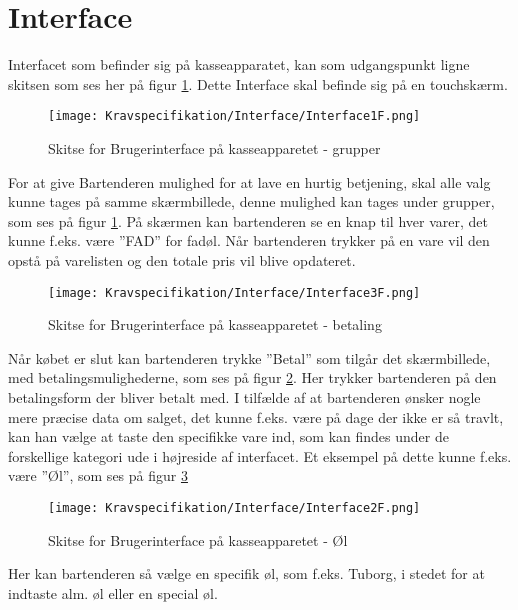 \section{Interface}
Interfacet som befinder sig på kasseapparatet, kan som udgangspunkt ligne skitsen som ses her på figur \ref{fig:Interface1}. Dette Interface skal befinde sig på en touchskærm.

\begin{figure}[ht]
	\centering
	\texttt{[image: Kravspecifikation/Interface/Interface1F.png]}
	\caption{Skitse for Brugerinterface på kasseapparetet - grupper}
	\label{fig:Interface1}
\end{figure}

For at give Bartenderen mulighed for at lave en hurtig betjening, skal alle valg kunne tages på samme skærmbillede, denne mulighed kan tages under grupper, som ses på figur \ref{fig:Interface1}. 
\newline\newline
På skærmen kan bartenderen se en knap til hver varer, det kunne f.eks. være ''FAD'' for fadøl. Når bartenderen trykker på en vare vil den opstå på varelisten og den totale pris vil blive opdateret. 

\begin{figure}[H]
	\centering
	\texttt{[image: Kravspecifikation/Interface/Interface3F.png]}
	\caption{Skitse for Brugerinterface på kasseapparetet - betaling}
	\label{fig:Interface3}
\end{figure}
Når købet er slut kan bartenderen trykke ''Betal'' som tilgår det skærmbillede, med betalingsmulighederne, som ses på figur \ref{fig:Interface3}. Her trykker bartenderen på den betalingsform der bliver betalt med. 
\newpage
I tilfælde af at bartenderen ønsker nogle mere præcise data om salget, det kunne f.eks. være på dage der ikke er så travlt, kan han vælge at taste den specifikke vare ind, som kan findes under de forskellige kategori ude i højreside af interfacet. Et eksempel på dette kunne f.eks. være ''Øl'', som ses på figur \ref{fig:Interface2}

\begin{figure}[ht]
	\centering
	\texttt{[image: Kravspecifikation/Interface/Interface2F.png]}
	\caption{Skitse for Brugerinterface på kasseapparetet - Øl}
	\label{fig:Interface2}
\end{figure}

Her kan bartenderen så vælge en specifik øl, som f.eks. Tuborg, i stedet for at indtaste alm. øl eller en special øl.

